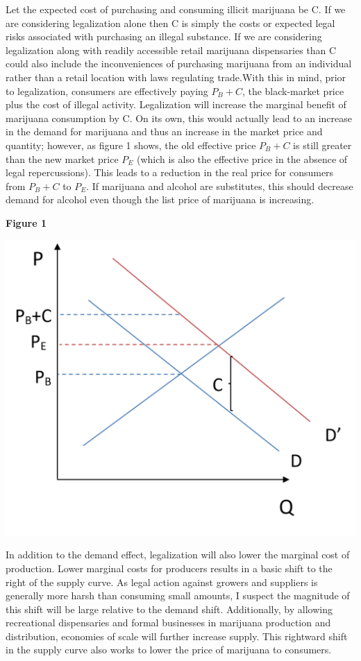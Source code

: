 \documentclass[11pt]{article}
\begin{document}
 Let the expected cost of purchasing and consuming illicit marijuana be C. If we are considering legalization alone then C is simply the costs or expected legal risks associated with purchasing an illegal substance. If we are considering legalization along with readily accessible retail marijuana dispensaries than C could also include the inconveniences of purchasing marijuana from an individual rather than a retail location with laws regulating trade.With this in mind, prior to legalization, consumers are effectively paying $P_B + C$, the black-market price plus the cost of illegal activity. Legalization will increase the marginal benefit of marijuana consumption by C. On its own, this would actually lead to an increase in the demand for marijuana and thus an increase in the market price and quantity; however, as figure 1 shows, the old effective price $ P_B + C$ is still greater than the new market price $P_E$ (which is also the effective price in the absence of legal repercussions). This leads to a reduction in the real price for consumers from $ P_B + C$ to $P_E$. If marijuana and alcohol are substitutes, this should decrease demand for alcohol even though the list price of marijuana is increasing.\par
\begin{center}
	\centering
	
	\textbf{Figure 1}\par\medskip
	
	\includegraphics[width=.5\linewidth]{legal_dside.png}
	
\end{center}


In addition to the demand effect, legalization will also lower the marginal cost of production. Lower marginal costs for producers results in a basic shift to the right of the supply curve. As legal action against growers and suppliers is generally more harsh than consuming small amounts, I suspect the magnitude of this shift will be large relative to the demand shift. Additionally, by allowing recreational dispensaries and formal businesses in marijuana production and distribution, economies of scale will further increase supply. This rightward shift in the supply curve also works to lower the price of marijuana to consumers. \par
\end{document}
